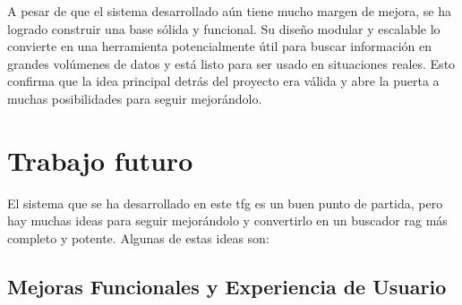 A pesar de que el sistema desarrollado aún tiene mucho margen de mejora, se ha logrado construir una base sólida y funcional. Su diseño modular y escalable lo convierte en una herramienta potencialmente útil para buscar información en grandes volúmenes de datos y está listo para ser usado en situaciones reales. Esto confirma que la idea principal detrás del proyecto era válida y abre la puerta a muchas posibilidades para seguir mejorándolo.

\section{Trabajo futuro}
\label{trabajo_futuro}

El sistema que se ha desarrollado en este \gls{tfg} es un buen punto de partida, pero hay muchas ideas para seguir mejorándolo y convertirlo en un buscador \gls{rag} más completo y potente. Algunas de estas ideas son:

\subsection{Mejoras Funcionales y Experiencia de Usuario}

